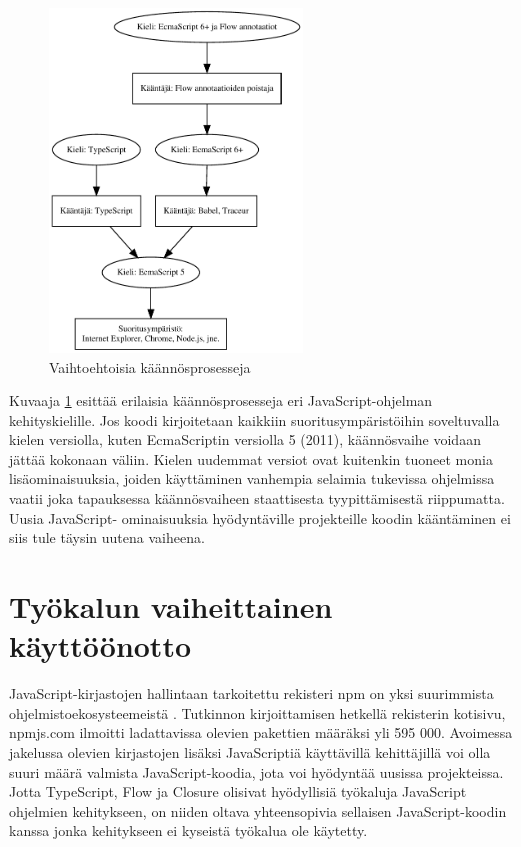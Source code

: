 \begin{figure}
\centering
\includegraphics[width=0.6\textwidth]{images/compilation.pdf}
\caption{Vaihtoehtoisia käännösprosesseja}
\label{fig:compilation}
\end{figure}

Kuvaaja \ref{fig:compilation} esittää erilaisia käännösprosesseja eri
JavaScript-ohjelman kehityskielille. Jos koodi kirjoitetaan kaikkiin
suoritusympäristöihin soveltuvalla kielen versiolla, kuten EcmaScriptin
versiolla 5 (2011), käännösvaihe voidaan jättää kokonaan väliin. Kielen
uudemmat versiot ovat kuitenkin tuoneet monia lisäominaisuuksia, joiden
käyttäminen vanhempia selaimia tukevissa ohjelmissa vaatii joka tapauksessa
käännösvaiheen staattisesta tyypittämisestä riippumatta. Uusia JavaScript-
ominaisuuksia hyödyntäville projekteille koodin kääntäminen ei siis tule
täysin uutena vaiheena.

\section{Työkalun vaiheittainen käyttöönotto}

JavaScript-kirjastojen hallintaan tarkoitettu rekisteri npm on yksi
suurimmista ohjelmistoekosysteemeistä \cite{DynamicsOfJSPackages}.
Tutkinnon kirjoittamisen hetkellä rekisterin kotisivu, npmjs.com ilmoitti
ladattavissa olevien pakettien määräksi yli 595 000. Avoimessa jakelussa
olevien kirjastojen lisäksi JavaScriptiä käyttävillä kehittäjillä voi olla
suuri määrä valmista JavaScript-koodia, jota voi hyödyntää uusissa
projekteissa. Jotta TypeScript, Flow ja Closure olisivat hyödyllisiä
työkaluja JavaScript ohjelmien kehitykseen, on niiden oltava yhteensopivia
sellaisen JavaScript-koodin kanssa jonka kehitykseen ei kyseistä työkalua
ole käytetty.

